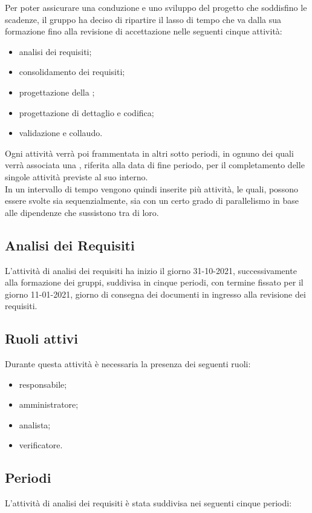 Per poter assicurare una conduzione e uno sviluppo del progetto che soddisfino le scadenze, il gruppo ha deciso di ripartire il lasso di tempo che va dalla sua formazione fino alla revisione di accettazione nelle seguenti cinque attività: 

\begin{itemize} 
	\item analisi dei requisiti; 
	\item consolidamento dei requisiti; 
	\item progettazione della ; 
	\item progettazione di dettaglio e codifica; 
	\item validazione e collaudo. 
\end{itemize}	 
Ogni attività verrà poi frammentata in altri sotto periodi, in ognuno dei quali verrà associata una , 
riferita alla data di fine periodo, per il completamento delle singole attività previste al suo interno.\\ 
In un intervallo di tempo vengono quindi inserite più attività, le quali, possono essere svolte sia sequenzialmente, sia con un certo grado di parallelismo in base alle dipendenze che sussistono tra di loro. 

\subsection{Analisi dei Requisiti} 
L’attività di analisi dei requisiti ha inizio il giorno 31-10-2021, successivamente alla formazione dei gruppi, suddivisa in cinque periodi, con termine fissato per il giorno 11-01-2021, giorno di consegna dei documenti in ingresso alla revisione dei requisiti. 

\subsection{Ruoli attivi} 
Durante questa attività è necessaria la presenza dei seguenti ruoli: 
\begin{itemize} 
	\item responsabile; 
	\item amministratore; 
	\item analista; 
	\item verificatore. 
\end{itemize} 

\subsection{Periodi} 
L'attività di analisi dei requisiti è stata suddivisa nei seguenti cinque periodi: 


